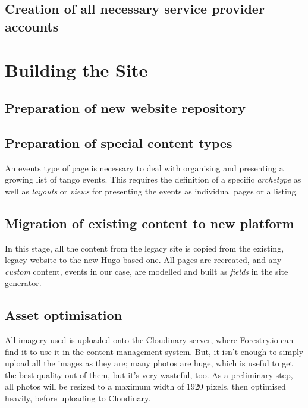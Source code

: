 \documentclass{article}
\begin{document}
\subsection{Creation of all necessary service provider accounts}
\label{sec:orgacc69fe}

\section{Building the Site}
\label{sec:org857acef}

\subsection{Preparation of new website repository}
\label{sec:org3f507c1}

\subsection{Preparation of special content types}
\label{sec:org34a4205}
An events type of page is necessary to deal with organising and presenting a
growing list of tango events. This requires the definition of a specific
\emph{archetype} as well as \emph{layouts} or \emph{views} for presenting the events as
individual pages or a listing.

\subsection{Migration of existing content to new platform}
\label{sec:org737d152}
In this stage, all the content from the legacy site is copied from the existing,
legacy website to the new Hugo-based one. All pages are recreated, and any
\emph{custom} content, events in our case, are modelled and built as \emph{fields} in the
site generator.

\subsection{Asset optimisation}
\label{sec:orgb6a28f9}
All imagery used is uploaded onto the Cloudinary server, where Forestry.io can
find it to use it in the content management system. But, it isn't enough to
simply upload all the images as they are; many photos are huge, which is useful
to get the best quality out of them, but it's very wasteful, too. As a
preliminary step, all photos will be resized to a maximum width of 1920 pixels,
then optimised heavily, before uploading to Cloudinary.
\end{document}
